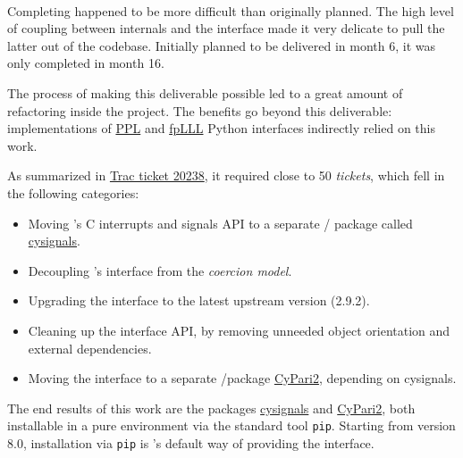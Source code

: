 \documentclass{deliverablereport}
\begin{document}
\paragraph{}
\label{UI@pari-python}

Completing  happened to be more difficult than
originally planned. The high level of coupling between \Sage internals
and the \Pari interface made it very delicate to pull the latter out
of the \Sage codebase. Initially planned to be delivered in month 6,
it was only completed in month 16.

The process of making this deliverable possible led to a great amount
of refactoring inside the \Sage project.
The benefits go beyond this deliverable:
implementations of \href{https://github.com/videlec/pplpy}{PPL}
and \href{https://github.com/fplll/fpylll}{fpLLL}
Python interfaces indirectly relied on this work.

As summarized in
\href{http://trac.sagemath.org/ticket/20238}{Trac ticket 20238},
it required close to 50 \emph{tickets}, which fell in the
following categories:

\begin{itemize}
\tightlist
\item Moving \Sage's C interrupts and signals API to a separate \Python/\Cython
  package called
  \href{https://github.com/sagemath/cysignals}{cysignals}.
\item Decoupling \Sage's \Pari interface from the \emph{coercion
    model}.
\item Upgrading the \Pari interface to the latest upstream version
  (2.9.2).
\item Cleaning up the \Pari interface API, by removing unneeded object
  orientation and external dependencies.
\item Moving the \Pari interface to a separate \Python/\Cython package
  \href{https://github.com/defeo/cypari2}{CyPari2}, depending
  on cysignals.
\end{itemize}

The end results of this work are the packages
\href{https://github.com/sagemath/cysignals}{cysignals} and
\href{https://github.com/defeo/cypari2}{CyPari2}, both installable
in a pure \Python environment via the standard tool
\texttt{pip}. Starting from version 8.0, installation via \texttt{pip}
is \Sage's default way of providing the \Pari interface.

\paragraph{} %
\end{document}
